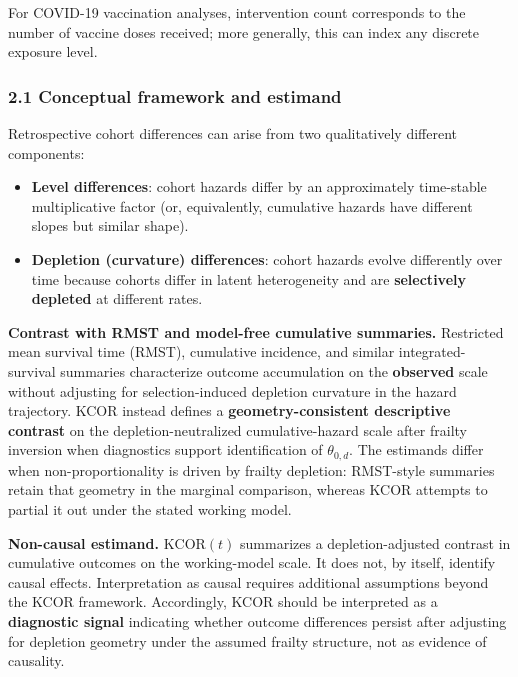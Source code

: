 \documentclass[
]{article}
\providecommand{\tightlist}{%
  \setlength{\itemsep}{0pt}\setlength{\parskip}{0pt}}
\begin{document}
For COVID-19 vaccination analyses, intervention count corresponds to the number of vaccine doses received; more generally, this can index any discrete exposure level.

\subsubsection{2.1 Conceptual framework and estimand}\label{conceptual-framework-and-estimand}

Retrospective cohort differences can arise from two qualitatively different components:

\begin{itemize}
\tightlist
\item
  \textbf{Level differences}: cohort hazards differ by an approximately time-stable multiplicative factor (or, equivalently, cumulative hazards have different slopes but similar shape).
\item
  \textbf{Depletion (curvature) differences}: cohort hazards evolve differently over time because cohorts differ in latent heterogeneity and are \textbf{selectively depleted} at different rates.
\end{itemize}

\textbf{Contrast with RMST and model-free cumulative summaries.} Restricted mean survival time (RMST), cumulative incidence, and similar integrated-survival summaries characterize outcome accumulation on the \textbf{observed} scale without adjusting for selection-induced depletion curvature in the hazard trajectory. KCOR instead defines a \textbf{geometry-consistent descriptive contrast} on the depletion-neutralized cumulative-hazard scale after frailty inversion when diagnostics support identification of \(\theta_{0,d}\). The estimands differ when non-proportionality is driven by frailty depletion: RMST-style summaries retain that geometry in the marginal comparison, whereas KCOR attempts to partial it out under the stated working model.

\textbf{Non-causal estimand.} \(\mathrm{KCOR}(t)\) summarizes a depletion-adjusted contrast in cumulative outcomes on the working-model scale. It does not, by itself, identify causal effects. Interpretation as causal requires additional assumptions beyond the KCOR framework. Accordingly, KCOR should be interpreted as a \textbf{diagnostic signal} indicating whether outcome differences persist after adjusting for depletion geometry under the assumed frailty structure, not as evidence of causality.
\end{document}
